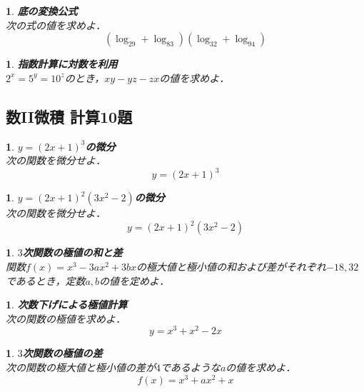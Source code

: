 \documentclass[10pt,
fleqn,
dvipdfmx,
uplatex
]{jsarticle}
\newtheorem{question}[Question]{}
\begin{document}
\begin{question}{\bf\boldmath 底の変換公式}\\
次の式の値を求めよ．
\[\left(\log _29+\log _83\right)\left(\log _32+\log _94\right)\]
\end{question}



\begin{question}{\bf\boldmath 指数計算に対数を利用}\\
$2^x=5^y={10}^z$のとき，$xy-yz-zx$の値を求めよ．
\end{question}

\subsection{数II微積 計算10題}



\begin{question}{\bf\boldmath $y=\left(2x+1\right)^3$の微分}\\
次の関数を微分せよ．
\[y=\left(2x+1\right)^3\]
\end{question}



\begin{question}{\bf\boldmath $y=\left(2x+1\right)^2\left(3x^2-2\right)$の微分}\\
次の関数を微分せよ．
\[y=\left(2x+1\right)^2\left(3x^2-2\right)\]
\end{question}



\begin{question}{\bf\boldmath $3$次関数の極値の和と差}\\
関数$f\left(x\right)=x^3-3ax^2+3bx$の極大値と極小値の和および差がそれぞれ$-{18}, {32}$であるとき，定数$a, b$の値を定めよ．
\end{question}



\begin{question}{\bf\boldmath 次数下げによる極値計算}\\
次の関数の極値を求めよ．
\[y=x^3+x^2-2x\]
\end{question}



\begin{question}{\bf\boldmath $3$次関数の極値の差}\\
次の関数の極大値と極小値の差が$4$であるような$a$の値を求めよ．
\[f\left(x\right)=x^3+ax^2+x\]
\end{question}
\end{document}
